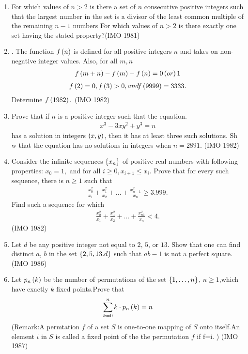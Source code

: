 \begin{enumerate}
 \item {} For which values of $n > 2$ is there a set of $n$ consecutive positive integers such that     the largest number in the set is a divisor of the least common multiple of the remaining $n-1$ numbers
	 For which values of $n > 2$ is there exactly one set having the stated property?\hfill(IMO 1981)
\item . The function $f\left(n\right)$ is defined for all positive integers $n$ and takes on non-negative integer values. Also, for all $m,n$
  \begin{align*}f\left(m + n\right) - f\left(m\right) - f\left(n\right) = 0  \left(or\right) 1 \end{align*}
 \begin{align*}f\left(2\right) = 0  , f\left(3\right) > 0,and  f\left(9999\right) = 3333.\end{align*}
       Determine $f\left(1982\right).$ \hfill(IMO 1982)
\item Prove that if $n$ is a positive integer such that the equation. \begin{align*}x^3 - 3xy^2 + y^3 =
n \end{align*}  has a solution in integers $\left(x, y\right)$, then it has at least three such solutions. Sh
w that the equation has no solutions in integers when $n = 2891.$ \hfill(IMO 1982)
	\item Consider the infinite sequences $\left\{x_n\right\}$ of positive real numbers with following properties:     
             $ x_{0}=1,$ and for  all  $i \geq 0, x_{i+1} \leq x_i.$ 
  Prove that for every such sequence, there is $n \geq 1$ such that
                      \begin{align*} \frac{x^{2}_{0}}{x_{1}}+ \frac{x^{2}_{1}}{x_{2}}+ ...+\frac{x^{2}_{n- 1}}{x_{n}} \geq 3.999.\end{align*}
  Find such a sequence for which
                    \begin{align*} \frac{x^{2}_{0}}{x_{1}}+ \frac{x^{2}_{1}}{x_{2}}+ ...+\frac{x^{2        }_{n1}}{x_{n}}< 4.\end{align*} \hfill(IMO 1982)
                    \item  Let $d$ be any positive integer not equal to $2$, $5$, or $13$. Show that one can find distinct $a$, $b$ in the set $\left\{2, 5, 13. d\right\}$ such that $ab-1$ is not a perfect square.\hfill(IMO 1986)

\item Let $p_n \left(k\right)$ be the number of permutations of the set $\left\{1,\dots
	    ,n\right\}$, $n\geq1$,which have exactly $k$ fixed points.Prove that 
		                 \begin{align*}   \sum_{k=0}^{n} k \cdot p_n\left(k\right) = n
					             \end{align*}
(Remark:A permtation $f$ of a set $S$ is one-to-one mapping of $S$ onto itself.An element $i$ in $S$ is called a fixed point of the the permutation $f$ if f=i. ) \hfill(IMO 1987)


\end{enumerate}
